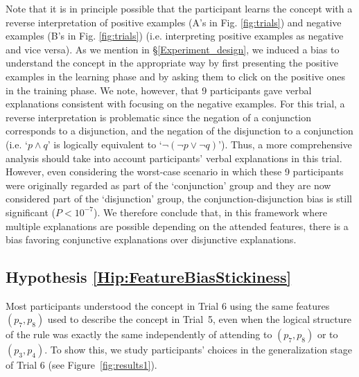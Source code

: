 Note that it is in principle possible that the participant learns the concept with a reverse interpretation of positive examples (A's in Fig. \ref{fig:trials}) and negative examples (B's in Fig. \ref{fig:trials}) (i.e. interpreting positive examples as negative and vice versa). As we mention in \S\ref{Experiment_design}, we induced a bias to understand the concept in the appropriate way by first presenting the positive examples in the learning phase and by asking them to click on the positive ones in the training phase. We note, however, that 9 participants gave verbal explanations consistent with focusing on the negative examples. For this trial, a reverse interpretation is problematic since the negation of a conjunction corresponds to a disjunction, and the negation of the disjunction to a conjunction (i.e. `$p\land q$' is logically equivalent to `$\lnot(\lnot p\lor \lnot q)$'). Thus, a more comprehensive analysis should take into account participants' verbal explanations in this trial. However, even considering the worst-case scenario in which these 9 participants were originally regarded as part of the `conjunction' group and they are now considered part of the `disjunction' group, the conjunction-disjunction bias is still significant ($P<10^{-7}$). We therefore conclude that, in this framework where multiple explanations are possible depending on the attended features, there is a bias favoring conjunctive explanations over disjunctive explanations. %


\subsection{Hypothesis \ref{Hip:FeatureBiasStickiness}}\label{Results:FeatureBiasStickiness}   
Most participants understood the concept in Trial 6 using the same features $(p_7,p_8)$ used to describe the concept in Trial~5, even when the logical structure of the rule was exactly the same independently of attending to $(p_7,p_8)$ or to $(p_3,p_4)$. To show this, we study participants' choices in the generalization stage of Trial 6 (see Figure~\ref{fig:results1}). 

